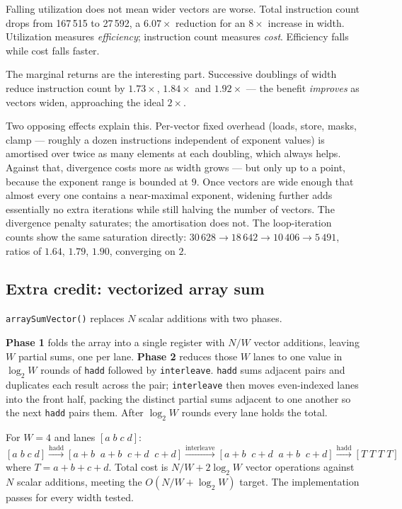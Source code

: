 \documentclass[11pt,a4paper]{article}
\begin{document}
Falling utilization does not mean wider vectors are worse. Total instruction
count drops from 167\,515 to 27\,592, a $6.07\times$ reduction for an
$8\times$ increase in width. Utilization measures \emph{efficiency}; instruction
count measures \emph{cost}. Efficiency falls while cost falls faster.

The marginal returns are the interesting part. Successive doublings of width
reduce instruction count by $1.73\times$, $1.84\times$ and $1.92\times$ --- the
benefit \emph{improves} as vectors widen, approaching the ideal $2\times$.

Two opposing effects explain this. Per-vector fixed overhead (loads, store,
masks, clamp --- roughly a dozen instructions independent of exponent values)
is amortised over twice as many elements at each doubling, which always helps.
Against that, divergence costs more as width grows --- but only up to a point,
because the exponent range is bounded at $9$. Once vectors are wide enough that
almost every one contains a near-maximal exponent, widening further adds
essentially no extra iterations while still halving the number of vectors. The
divergence penalty saturates; the amortisation does not. The loop-iteration
counts show the same saturation directly: $30\,628 \to 18\,642 \to 10\,406 \to
5\,491$, ratios of $1.64$, $1.79$, $1.90$, converging on $2$.

\subsection{Extra credit: vectorized array sum}

\texttt{arraySumVector()} replaces $N$ scalar additions with two phases.

\textbf{Phase 1} folds the array into a single register with $N/W$ vector
additions, leaving $W$ partial sums, one per lane. \textbf{Phase 2} reduces
those $W$ lanes to one value in $\log_2 W$ rounds of
\texttt{hadd} followed by \texttt{interleave}. \texttt{hadd} sums adjacent
pairs and duplicates each result across the pair; \texttt{interleave} then
moves even-indexed lanes into the front half, packing the distinct partial sums
adjacent to one another so the next \texttt{hadd} pairs them. After $\log_2 W$
rounds every lane holds the total.

For $W = 4$ and lanes $[a\;b\;c\;d]$:
\[
[a\;b\;c\;d]
\xrightarrow{\text{hadd}} [a{+}b\;\;a{+}b\;\;c{+}d\;\;c{+}d]
\xrightarrow{\text{interleave}} [a{+}b\;\;c{+}d\;\;a{+}b\;\;c{+}d]
\xrightarrow{\text{hadd}} [T\;T\;T\;T]
\]
where $T = a+b+c+d$. Total cost is $N/W + 2\log_2 W$ vector operations against
$N$ scalar additions, meeting the $O(N/W + \log_2 W)$ target. The
implementation passes for every width tested.
\end{document}
